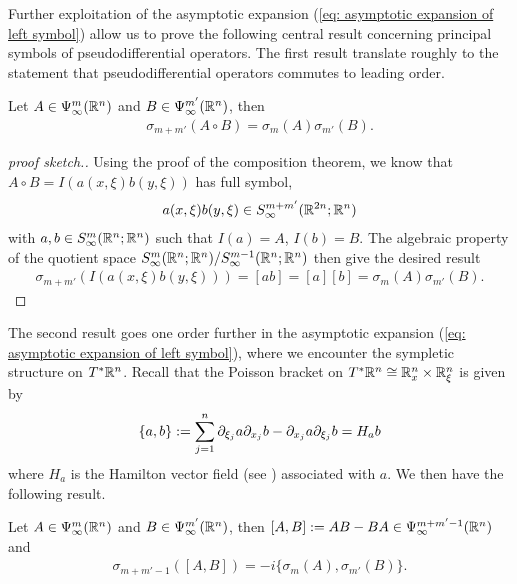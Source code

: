 \documentclass[12pt]{article}
\begin{document}
Further exploitation of the asymptotic expansion (\ref{eq: asymptotic expansion of left symbol}) allow us to prove the following central result concerning principal symbols of pseudodifferential operators. The first result translate roughly to the statement that pseudodifferential operators commutes to leading order. 

\begin{fprop}
    Let $A \in \Psi^{m}_{\infty}({\mathbb R}^n)$ and $B \in \Psi^{m'}_{\infty}({\mathbb R}^n)$, then 
    \begin{align*}
    \sigma_{m + m'}(A \circ B) = \sigma_m(A) \sigma_{m'}(B). 
    \end{align*}
\end{fprop}
\begin{proof}[proof sketch.] Using the proof of the composition theorem, we know that $A \circ B = I(a(x, \xi)b(y, \xi))$ has full symbol, 
    \begin{align*}
    a(x, \xi) b(y, \xi) \in S^{m + m'}_\infty({\mathbb R}^{2n}; {\mathbb R}^n)
    \end{align*}
    with $a, b \in S^{m}_\infty({\mathbb R}^{n}; {\mathbb R}^n)$ such that $I(a) = A$, $I(b) = B$. The algebraic property of the quotient space $S^{m}_\infty({\mathbb R}^{n}; {\mathbb R}^n) / S^{m-1}_\infty({\mathbb R}^{n}; {\mathbb R}^n)$ then give the desired result
    \begin{align*}
    \sigma_{m + m'}(I(a(x,\xi)b(y, \xi))) = [a b] = [a] [b] =  \sigma_m(A) \sigma_{m'}(B). 
    \end{align*}
\end{proof}

The second result goes one order further in the asymptotic expansion (\ref{eq: asymptotic expansion of left symbol}), where we encounter the sympletic structure on $T^*{\mathbb R}^n$. Recall that the Poisson bracket on $T^*{\mathbb R}^n \cong {\ensuremath {\mathbb R}}^n_x \times {\ensuremath {\mathbb R}}^n_\xi $ is given by 
\begin{align*}
\{a, b\} := \sum_{j = 1}^n \partial_{\xi_j}a \partial_{x_j}b - \partial_{x_j} a \partial_{\xi_j}b = H_{a}b 
\end{align*}
where $H_a$ is the Hamilton vector field (see \cite{LeeSM}) associated with $a$. We then have the following result. 
\begin{fprop}
    Let $A \in \Psi^{m}_{\infty}({\mathbb R}^n)$ and $B \in \Psi^{m'}_{\infty}({\mathbb R}^n)$, then $[A, B] := AB - BA \in \Psi^{m + m' - 1}_{\infty}({\mathbb R}^n)$ and 
    \begin{align*}
    \sigma_{m + m' -1}([A, B]) = -i \{ \sigma_{m}(A), \sigma_{m'}(B) \}. 
    \end{align*}
\end{fprop}
\end{document}

